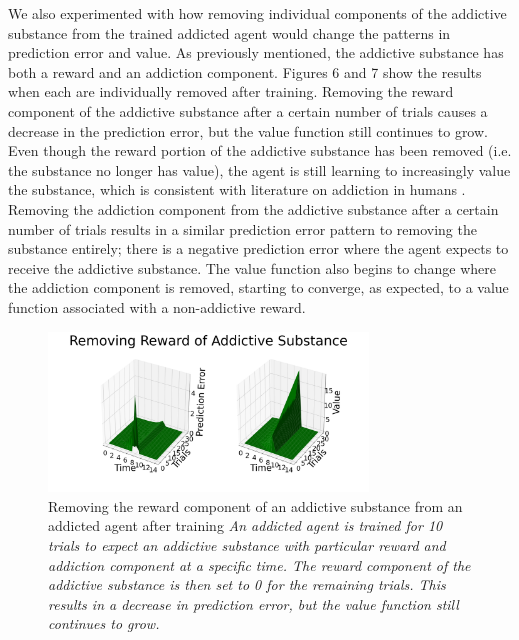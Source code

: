 \documentclass[10pt,letterpaper]{article}
\begin{document}
We also experimented with how removing individual components of the addictive substance from the trained addicted agent would change the patterns in prediction error and value. As previously mentioned, the addictive substance has both a reward and an addiction component. Figures 6 and 7 show the results when each are individually removed after training. Removing the reward component of the addictive substance after a certain number of trials causes a decrease in the prediction error, but the value function still continues to grow. Even though the reward portion of the addictive substance has been removed (i.e. the substance no longer has value), the agent is still learning to increasingly value the substance, which is consistent with literature on addiction in humans \cite{Hyman2001, Koob1992}. Removing the addiction component from the addictive substance after a certain number of trials results in a similar prediction error pattern to removing the substance entirely; there is a negative prediction error where the agent expects to receive the addictive substance. The value function also begins to change where the addiction component is removed, starting to converge, as expected, to a value function associated with a non-addictive reward.

\begin{figure}[H]
   \centering
    \includegraphics[width = 85mm]{graphs/add_rew_remove.png}
    \caption{Removing the reward component of an addictive substance from an addicted agent after training
    \newline \emph{An addicted agent is trained for 10 trials to expect an addictive substance with particular reward and addiction component at a specific time. The reward component of the addictive substance is then set to 0 for the remaining trials. This results in a decrease in prediction error, but the value function still continues to grow.}}
    \label{fig:Baseline}
\end{figure}
\end{document}
